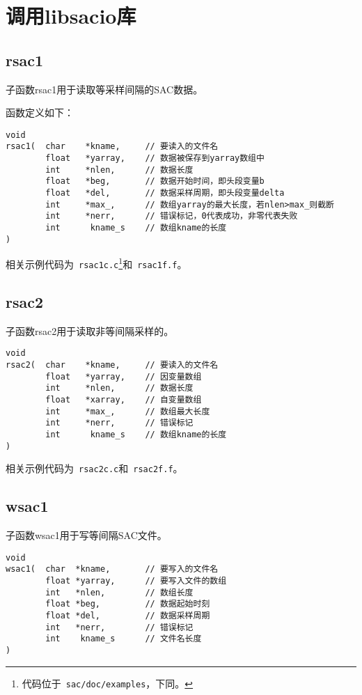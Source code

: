 \section{调用libsacio库}
\label{sec:libsacio}
\subsection{rsac1}
子函数rsac1用于读取等采样间隔的SAC数据。

函数定义如下：
\begin{verbatim}
void
rsac1(  char    *kname,     // 要读入的文件名
        float   *yarray,    // 数据被保存到yarray数组中
        int     *nlen,      // 数据长度
        float   *beg,       // 数据开始时间，即头段变量b
        float   *del,       // 数据采样周期，即头段变量delta
        int     *max_,      // 数组yarray的最大长度，若nlen>max_则截断
        int     *nerr,      // 错误标记，0代表成功，非零代表失败
        int      kname_s    // 数组kname的长度
)
\end{verbatim}

相关示例代码为~\verb+rsac1c.c+\footnote{代码位于~\verb+sac/doc/examples+，下同。}和~\verb+rsac1f.f+。

\subsection{rsac2}
子函数rsac2用于读取非等间隔采样的。
\begin{verbatim}
void
rsac2(  char    *kname,     // 要读入的文件名
        float   *yarray,    // 因变量数组
        int     *nlen,      // 数据长度
        float   *xarray,    // 自变量数组
        int     *max_,      // 数组最大长度
        int     *nerr,      // 错误标记
        int      kname_s    // 数组kname的长度
)
\end{verbatim}
相关示例代码为~\verb+rsac2c.c+和~\verb+rsac2f.f+。

\subsection{wsac1}
子函数wsac1用于写等间隔SAC文件。
\begin{verbatim}
void
wsac1(  char  *kname,       // 要写入的文件名
        float *yarray,      // 要写入文件的数组
        int   *nlen,        // 数组长度
        float *beg,         // 数据起始时刻
        float *del,         // 数据采样周期
        int   *nerr,        // 错误标记
        int    kname_s      // 文件名长度
)
\end{verbatim}

